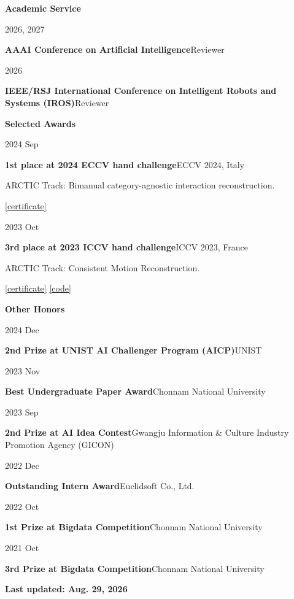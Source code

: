 \documentclass[10pt,a4paper]{article}
\newlength{\datecolwidth}
\newlength{\rowcolgap}
\newlength{\entrymargin}
\newcommand{\link}[2]{\href{#1}{\textcolor{linkcolor}{#2}}}
\newcommand{\cvstrong}[1]{\textbf{\textcolor{strongcolor}{#1}}}
\newcommand{\cvmuted}[1]{\textcolor{muted}{#1}}
\newcommand{\AwardEccvHandChallenge}{https://on-jungwoan.github.io/assets/eccv_award.pdf}
\newcommand{\AwardIccvHandChallenge}{https://on-jungwoan.github.io/assets/ICCV_award.png}
\newcommand{\CodeIccvHandChallenge}{https://github.com/On-JungWoan/UVHand}
\newcommand{\cvsection}[1]{%
  \vspace{20pt}
  {\large\bfseries\textcolor{accent}{#1}}\par
  \vspace{3pt}{\color{rulegray}\hrule}\vspace{5pt}
}
\newcommand{\cvrow}[3]{%
  \noindent
  \begin{minipage}[t]{#1}
    \vspace{0pt}#2
  \end{minipage}%
  \hspace{\rowcolgap}%
  \begin{minipage}[t]{\dimexpr\textwidth-#1-\rowcolgap\relax}
    \vspace{0pt}#3
  \end{minipage}\par
}
\newcommand{\compactentry}[3]{%
  \cvrow{\datecolwidth}
    {\textcolor{muted}{#1}}
    {\cvstrong{#2}\hfill{\small\textcolor{muted}{#3}}}\vspace{\entrymargin}
}
\newcommand{\awarditem}[5]{%
  \cvrow{\datecolwidth}
    {\textcolor{muted}{#1}}
    {\textbf{#2}\hfill{\small\cvmuted{#3}}\par
      {\small\cvmuted{#4}}\par
      {\small\textcolor{muted}{#5}}}\vspace{\entrymargin}
}
\begin{document}
\cvsection{Academic Service}
\compactentry{2026, 2027}
  {AAAI Conference on Artificial Intelligence}
  {Reviewer}

\compactentry{2026}
  {IEEE/RSJ International Conference on Intelligent Robots and Systems (IROS)}
  {Reviewer}

\cvsection{Selected Awards}
\awarditem{2024 Sep}
  {1st place at 2024 ECCV hand challenge}
  {ECCV 2024, Italy}
  {ARCTIC Track: Bimanual category-agnostic interaction reconstruction.}
  {\link{\AwardEccvHandChallenge}{[certificate]}}

\awarditem{2023 Oct}
  {3rd place at 2023 ICCV hand challenge}
  {ICCV 2023, France}
  {ARCTIC Track: Consistent Motion Reconstruction.}
  {\link{\AwardIccvHandChallenge}{[certificate]} \link{\CodeIccvHandChallenge}{[code]}}

\cvsection{Other Honors}
\compactentry{2024 Dec}
  {2nd Prize at UNIST AI Challenger Program (AICP)}
  {UNIST}

\compactentry{2023 Nov}
  {Best Undergraduate Paper Award}
  {Chonnam National University}

\compactentry{2023 Sep}
  {2nd Prize at AI Idea Contest}
  {Gwangju Information \& Culture Industry Promotion Agency (GICON)}

\compactentry{2022 Dec}
  {Outstanding Intern Award}
  {Euclidsoft Co., Ltd.}

\compactentry{2022 Oct}
  {1st Prize at Bigdata Competition}
  {Chonnam National University}

\compactentry{2021 Oct}
  {3rd Prize at Bigdata Competition}
  {Chonnam National University}

\vfill
\begin{flushright}
  {\textbf{\textcolor{muted}{Last updated: Aug. 29, 2026}}}
\end{flushright}
\end{document}

